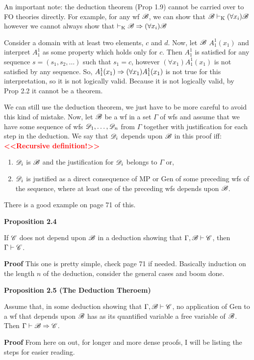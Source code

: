 An important note: the deduction theorem (Prop 1.9) cannot be carried over to FO theories directly. For example, for any wf $\mathscr{B}$, we can show that $\mathscr{B} \vdash_\text{K} (\forall x_i) \mathscr{B}$ however we cannot always show that $\vdash_\text{K} \mathscr{B} \Rightarrow (\forall x_i) \mathscr{B}$

Consider a domain with at least two elements, $c$ and $d$. Now, let $\mathscr{B}$ $A_1^1(x_1)$ and interpret $A_1^1$ as some property which holds only for $c$. Then $A_1^1$ is satisfied for any sequence $s=(s_1,s_2, \dots)$ such that $s_1=c$, however $(\forall x_1)A_1^1(x_1)$ is not satisfied by any sequence. So, $A_1^1(x_1) \Rightarrow (\forall x_1) A_1^1(x_1)$ is not true for this interpretation, so it is not logically valid. Because it is not logically valid, by Prop 2.2 it cannot be a theorem. 

We can still use the deduction theorem, we just have to be more careful to avoid this kind of mistake. Now, let $\mathscr{B}$ be a wf in a set $\Gamma$ of wfs and assume that we have some sequence of wfs $\mathscr{D}_1, \dots, \mathscr{D}_n$ from $\Gamma$ together with justification for each step in the deduction. We say that $\mathscr{D}_i$ depends upon $\mathscr{B}$ in this proof iff: \textcolor{red}{\textbf{<<Recursive definition!>>}}
\begin{enumerate}
    \item $\mathscr{D}_i$ is $\mathscr{B}$ and the justification for $\mathscr{D}_i$ belongs to $\Gamma$ or,
    \item $\mathscr{D}_i$ is justified as a direct consequence of MP or Gen of some preceding wfs of the sequence, where at least one of the preceding wfs depends upon $\mathscr{B}$.
\end{enumerate}

There is a good example on page 71 of this.

\textbf{Proposition 2.4}

If $\mathscr{C}$ does not depend upon $\mathscr{B}$ in a deduction showing that $\Gamma, \mathscr{B} \vdash \mathscr{C}$, then $\Gamma \vdash \mathscr{C}$.

\textbf{Proof}
This one is pretty simple, check page 71 if needed. Basically induction on the length $n$ of the deduction, consider the general cases and boom done.

\textbf{Proposition 2.5 (The Deduction Theroem)}

Assume that, in some deduction showing that $\Gamma, \mathscr{B} \vdash \mathscr{C}$, no application of Gen to a wf that depends upon $\mathscr{B}$ has as its quantified variable a free variable of $\mathscr{B}$. Then $\Gamma \vdash \mathscr{B} \Rightarrow \mathscr{C}$.

\textbf{Proof}
From here on out, for longer and more dense proofs, I will be listing the steps for easier reading.

